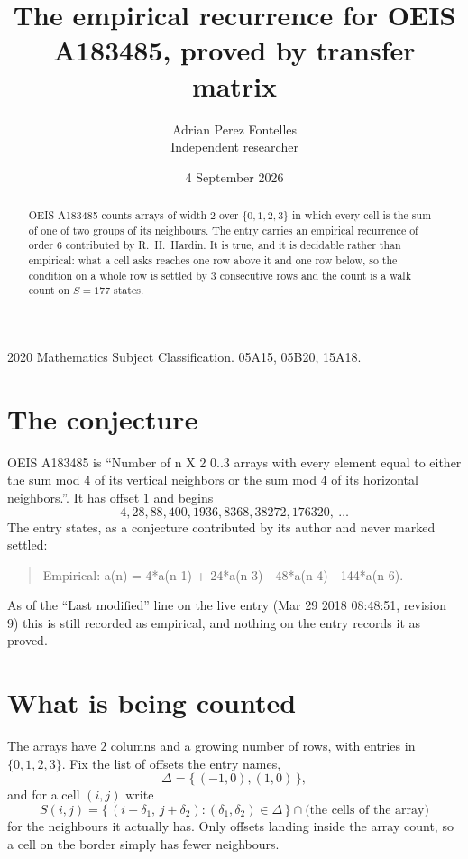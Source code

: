 \documentclass[11pt,a4paper]{article}
\title{The empirical recurrence for OEIS A183485, proved by transfer matrix}
\author{Adrian Perez Fontelles\\ \small Independent researcher}
\date{4 September 2026}
\theoremstyle{plain}
\theoremstyle{definition}
\begin{document}
\maketitle

\begin{abstract}
OEIS A183485 counts arrays of width $2$ over $\{0,1,2,3\}$ in which every cell is the sum of one of two groups of its neighbours. The entry carries an
empirical recurrence of order $6$ contributed by R.~H.~Hardin. It is true, and it is
decidable rather than empirical: what a cell asks reaches one row above
it and one row below, so the condition on a whole row is settled by
$3$ consecutive rows and the count is a walk count on $S=177$ states.
\end{abstract}

\noindent\small 2020 Mathematics Subject Classification. 05A15, 05B20, 15A18.\normalsize

\section{The conjecture}

OEIS A183485 is ``Number of n X 2 0..3 arrays with every element equal to either the sum mod 4 of its vertical neighbors or the sum mod 4 of its horizontal neighbors.''. It has offset $1$ and begins
\[
4, 28, 88, 400, 1936, 8368, 38272, 176320,\ \dots
\]
The entry states, as a conjecture contributed by its author and never marked settled:
\begin{quote}
Empirical: a(n) = 4*a(n-1) + 24*a(n-3) - 48*a(n-4) - 144*a(n-6).
\end{quote}
As of the ``Last modified'' line on the live entry (Mar 29 2018 08:48:51, revision 9) this is still
recorded as empirical, and nothing on the entry records it as proved.

\section{What is being counted}

The arrays have $2$ columns and a growing number of rows, with entries in $\{0,1,2,3\}$. Fix the
list of offsets the entry names,
\[
\Delta=\{\,(-1,0), (1,0)\,\},
\]
and for a cell $(i,j)$ write
\[
S(i,j)=\{\,(i+\delta_1,\,j+\delta_2) : (\delta_1,\delta_2)\in\Delta\,\}\cap
\text{(the cells of the array)}
\]
for the neighbours it actually has. Only offsets landing inside the array count, so a cell on
the border simply has fewer neighbours.
\end{document}
